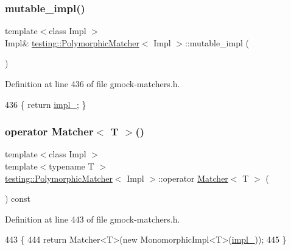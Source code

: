 \subsubsection{\texorpdfstring{mutable\+\_\+impl()}{mutable\_impl()}}
{\footnotesize\ttfamily template$<$class Impl $>$ \\
Impl\& \hyperlink{classtesting_1_1PolymorphicMatcher}{testing\+::\+Polymorphic\+Matcher}$<$ Impl $>$\+::mutable\+\_\+impl (\begin{DoxyParamCaption}{ }\end{DoxyParamCaption})\hspace{0.3cm}{\ttfamily [inline]}}



Definition at line 436 of file gmock-\/matchers.\+h.


\begin{DoxyCode}
436 \{ \textcolor{keywordflow}{return} \hyperlink{classtesting_1_1PolymorphicMatcher_adadea4f2c7b639586ed2f21b27303382}{impl\_}; \}
\end{DoxyCode}
\mbox{\label{classtesting_1_1PolymorphicMatcher_a6280c1485ca41a48c858c38828c1e04e}} 
\subsubsection{\texorpdfstring{operator Matcher$<$ T $>$()}{operator Matcher< T >()}}
{\footnotesize\ttfamily template$<$class Impl $>$ \\
template$<$typename T $>$ \\
\hyperlink{classtesting_1_1PolymorphicMatcher}{testing\+::\+Polymorphic\+Matcher}$<$ Impl $>$\+::operator \hyperlink{classtesting_1_1Matcher}{Matcher}$<$ T $>$ (\begin{DoxyParamCaption}{ }\end{DoxyParamCaption}) const\hspace{0.3cm}{\ttfamily [inline]}}



Definition at line 443 of file gmock-\/matchers.\+h.


\begin{DoxyCode}
443                               \{
444     \textcolor{keywordflow}{return} Matcher<T>(\textcolor{keyword}{new} MonomorphicImpl<T>(\hyperlink{classtesting_1_1PolymorphicMatcher_adadea4f2c7b639586ed2f21b27303382}{impl\_}));
445   \}
\end{DoxyCode}


